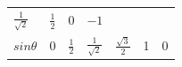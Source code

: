 {\begin{tabular}[t]{|l|l|l|l|l|l|l|}
                $\frac{1}{\sqrt{2}}$
               &
                $\frac{1}{2}$
               &
        0 &
                $-1$
     \tabularnewline\cline{1-1}\cline{2-2}\cline{3-3}\cline{4-4}\cline{5-5}\cline{6-6}\cline{7-7}
                $sin\theta $
               &
        0 &
                $\frac{1}{2}$
               &
                $\frac{1}{\sqrt{2}}$
               &
                $\frac{\sqrt{3}}{2}$
               &
        1 &
        0%
     \tabularnewline\cline{1-1}\cline{2-2}\cline{3-3}\cline{4-4}\cline{5-5}\cline{6-6}\cline{7-7}

\end{tabular}}
